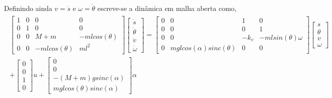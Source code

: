 \documentclass[a4paper,10pt]{article}
\begin{document}
\paragraph{}Definindo ainda $v = \dot{s}$ e $\omega = \dot{\theta}$ escreve-se a dinâmica em malha aberta como,
\begin{gather}
	\begin{split}
			\begin{bmatrix}
			1 & 0 & 0 & 0 \\
			0 & 1 & 0 & 0 \\
			0 & 0 & M+m & -mlcos(\theta) \\
			0 & 0 & -mlcos(\theta) & ml^2
		\end{bmatrix}\begin{bmatrix}
			\dot{s} \\ \dot{\theta} \\ \dot{v} \\ \dot{\omega}
		\end{bmatrix} = \begin{bmatrix}
			0 & 0 & 1 & 0 \\
			0 & 0 & 0 & 1 \\
			0 & 0 & -k_v & -mlsin(\theta)\omega \\
			0 & mglcos(\alpha)sinc(\theta) & 0 & 0
		\end{bmatrix}\begin{bmatrix}
			s \\ \theta \\ v \\ \omega
		\end{bmatrix} \\
	+ \begin{bmatrix}
		0 \\ 0 \\ 1 \\ 0
	\end{bmatrix}u + \begin{bmatrix}
	0 \\ 0 \\ -(M+m)gsinc(\alpha) \\ mglcos(\theta)sinc(\alpha)
\end{bmatrix}\alpha
	\end{split}
\end{gather}
\end{document}

